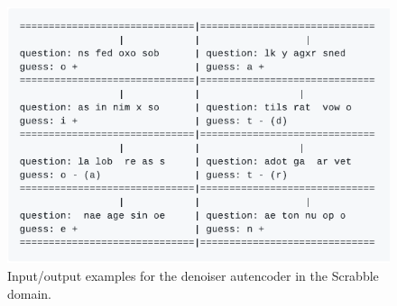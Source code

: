 \begin{figure}
  \includegraphics[width=0.6\linewidth]{img/denoiser_scrabble_examples}
  \caption{
    Input/output examples for the denoiser autencoder in the Scrabble domain.
  }\label{fig:denoiser_scrabble_examples}
\end{figure}
